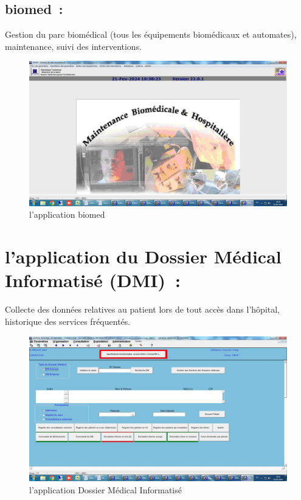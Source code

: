 \documentclass[12pt]{rapportINPTCLOUD}
\begin{document}
\subsection{biomed :}  Gestion du parc biomédical (tous les équipements biomédicaux et automates), maintenance, suivi des interventions.
\begin{figure}[H]
	\centering
	\includegraphics[width=1\linewidth]{img/k.jpg}
	\caption{l'application biomed}
	\label{fig:biomed}
\end{figure}
\newpage
	\section{\textcolor{sectioncolor}{l'application du Dossier Médical Informatisé (DMI) :}}
	
	Collecte des données relatives au patient lors de tout accès dans l'hôpital, historique des services fréquentés.
\begin{figure}[H]
	\centering
	\includegraphics[width=1\linewidth]{img/l.jpg}
	\caption{l'application Dossier Médical Informatisé}
	\label{fig:Dossier Médical Informatisé}
\end{figure}\newpage
\end{document}
